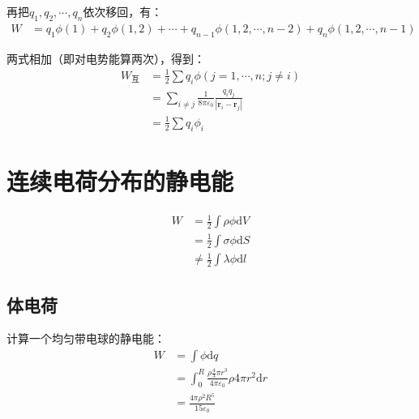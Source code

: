 \documentclass[12pt,onecolumn,a4paper]{book}
\numberwithin{table}{subsection}
\numberwithin{equation}{subsection}
\begin{document}
再把$q_1,q_2,\cdots,q_n$依次移回，有：
\begin{align}
    W & = q_1 \phi(1) + q_2 \phi(1,2) + \cdots + q_{n-1} \phi(1,2,\cdots,n-2) + q_n \phi(1,2,\cdots,n-1)
\end{align}

两式相加（即对电势能算两次），得到：
\begin{align}
    W_\text{互} & = \frac{1}{2} \sum q_i \phi(j=1,\cdots,n;j\neq i)                                        \\
               & = \sum_{i\neq j} \frac{1}{8\pi\varepsilon_0} \frac{q_i q_j}{|\mathbf{r}_i-\mathbf{r}_j|} \\
               & = \frac{1}{2}\sum q_i \phi_i
\end{align}

\section{连续电荷分布的静电能}

\begin{align}
    W & = \frac{1}{2} \int \rho \phi \mathrm{d} V        \\
      & =  \frac{1}{2} \int \sigma \phi \mathrm{d} S     \\
      & \neq  \frac{1}{2} \int \lambda \phi \mathrm{d} l
\end{align}

\subsection{体电荷}

计算一个均匀带电球的静电能：
\begin{align}
    W & = \int \phi \mathrm{d} q                                                                   \\
      & = \int_0^R \frac{\rho \frac{4}{3} \pi r^3}{4\pi\varepsilon_0 } \rho 4 \pi r^2 \mathrm{d} r \\
      & = \frac{4\pi\rho^2 R^5}{15\varepsilon_0}
\end{align}
\end{document}
